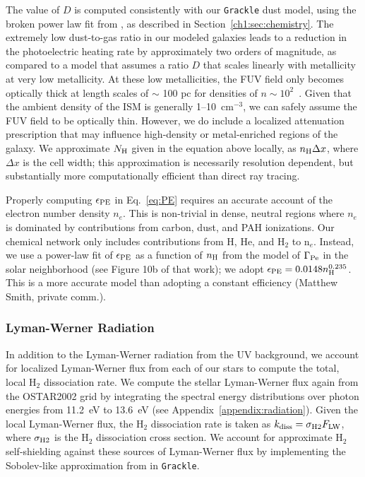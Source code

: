 The value of $D$ is computed consistently with our \texttt{Grackle} dust model, using the broken power law fit from \citet{Remy-Ruyer2014}, as described in Section~\ref{ch1:sec:chemistry}. The extremely low dust-to-gas ratio in our modeled galaxies leads to a reduction in the photoelectric heating rate by approximately two orders of magnitude, as compared to a model that assumes a ratio $D$ that scales linearly with metallicity at very low metallicity. At these low metallicities, the FUV field only becomes optically thick at length scales of $\sim$ 100 pc for densities of $n \sim 10^2$~\ccunit. Given that the ambient density of the ISM is generally 1--10~cm$^{-3}$, we can safely assume the FUV field to be optically thin. However, we do include a localized attenuation prescription that may influence high-density or metal-enriched regions of the galaxy. We approximate $N_{\rm H}$ given in the equation above locally, as $n_{\rm H}\Delta x$, where $\Delta x$ is the cell width; this approximation is necessarily resolution dependent, but substantially more computationally efficient than direct ray tracing.

Properly computing $\epsilon_{\rm PE}$ in Eq.~\ref{eq:PE} requires an accurate account of the electron number density $n_e$. This is non-trivial in dense, neutral regions where $n_e$ is dominated by contributions from carbon, dust, and PAH ionizations. Our chemical network only includes contributions from H, He, and H$_2$ to n$_e$. Instead, we use a power-law fit of $\epsilon_{\rm PE}$ as a function of $n_{\rm H}$ from the \citet{Wolfire2003} model of $\Gamma_{\rm{Pe}}$ in the solar neighborhood (see Figure 10b of that work); we adopt $\epsilon_{\rm PE} = 0.0148n_{\rm{H}}^{0.235}$. This is a more accurate model than adopting a constant efficiency (Matthew Smith, private comm.). %

\subsubsection{Lyman-Werner Radiation}
\label{ch1:sec:LW}
In addition to the Lyman-Werner radiation from the UV background, we account for localized Lyman-Werner flux from each of our stars to compute the total, local H$_2$ dissociation rate. We compute the stellar Lyman-Werner flux again from the OSTAR2002 grid by integrating the spectral energy distributions over photon energies from 11.2~eV to 13.6~eV (see Appendix~\ref{appendix:radiation}). Given the local Lyman-Werner flux, the H$_2$ dissociation rate is taken as $k_{\rm diss} = \sigma_{\rm H2} F_{\rm LW}$, where $\sigma_{\rm H2}$ is the H$_2$ dissociation cross section. We account for approximate H$_2$ self-shielding against these sources of Lyman-Werner flux by implementing the Sobolev-like approximation from \citet{Wolcott-Green2011} in \texttt{Grackle}.

